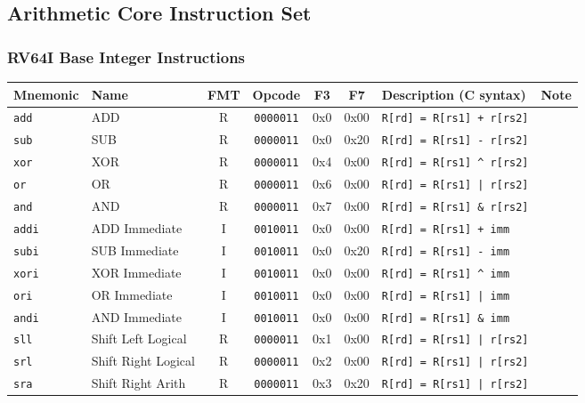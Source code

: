 \documentclass{article}
\newcommand{\code}[1]{\texttt{#1}}
\begin{document}
\subsection*{Arithmetic Core Instruction Set}

\subsubsection*{RV64I Base Integer Instructions}

\begin{tabular}
{l | l | c | c | c | c | l | l}
Mnemonic    & Name                  & FMT & Opcode        & F3  & F7    & Description (C syntax)  & Note \\ \hline
\code{add}  & ADD                   & R  & \code{0000011} & 0x0 & 0x00  & \code{R[rd] = R[rs1] + r[rs2]} \\
\code{sub}  & SUB                   & R  & \code{0000011} & 0x0 & 0x20  & \code{R[rd] = R[rs1] - r[rs2]} \\
\code{xor}  & XOR                   & R  & \code{0000011} & 0x4 & 0x00  & \code{R[rd] = R[rs1] \^{} r[rs2]} \\
\code{or}   & OR                    & R  & \code{0000011} & 0x6 & 0x00  & \code{R[rd] = R[rs1] | r[rs2]} \\
\code{and}  & AND                   & R  & \code{0000011} & 0x7 & 0x00  & \code{R[rd] = R[rs1] \& r[rs2]} \\ \hline

\code{addi} & ADD Immediate         & I  & \code{0010011} & 0x0 & 0x00  & \code{R[rd] = R[rs1] + imm} \\
\code{subi} & SUB Immediate         & I  & \code{0010011} & 0x0 & 0x20  & \code{R[rd] = R[rs1] - imm} \\
\code{xori} & XOR Immediate         & I  & \code{0010011} & 0x0 & 0x00  & \code{R[rd] = R[rs1] \^{} imm} \\
\code{ori}  & OR Immediate          & I  & \code{0010011} & 0x0 & 0x00  & \code{R[rd] = R[rs1] | imm} \\
\code{andi} & AND Immediate         & I  & \code{0010011} & 0x0 & 0x00  & \code{R[rd] = R[rs1] \& imm} \\ \hline

\code{sll}  & Shift Left Logical    & R  & \code{0000011} & 0x1 & 0x00  & \code{R[rd] = R[rs1] | r[rs2]} \\
\code{srl}  & Shift Right Logical   & R  & \code{0000011} & 0x2 & 0x00  & \code{R[rd] = R[rs1] | r[rs2]} \\
\code{sra}  & Shift Right Arith     & R  & \code{0000011} & 0x3 & 0x20  & \code{R[rd] = R[rs1] | r[rs2]} \\ \hline


\end{tabular}
\end{document}
